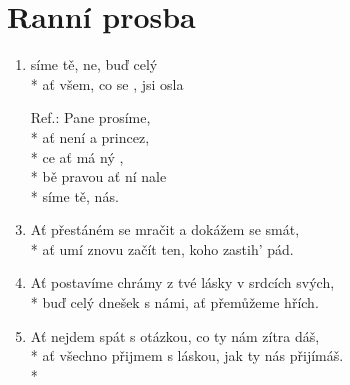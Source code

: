 \section{Ranní prosba}
\begin{enumerate}
\item {}síme tě, ne, buď  celý  \\*
ať  všem, co se , jsi  osla 
\item[Ref.:] Pane  prosíme,  \\*
ať  není  a  princez,\\*
ce ať má ný , \\*
bě pravou  ať ní nale \\*
síme tě,  nás.
\item Ať přestáném se mračit a dokážem se smát,\\*
ať umí znovu začít ten, koho zastih' pád.
\item Ať postavíme chrámy z tvé lásky v srdcích svých,\\*
buď celý dnešek s námi, ať přemůžeme hřích.
\item Ať nejdem spát s otázkou, co ty nám zítra dáš,\\*
ať všechno přijmem s láskou, jak ty nás přijímáš. \\*
\end{enumerate}
